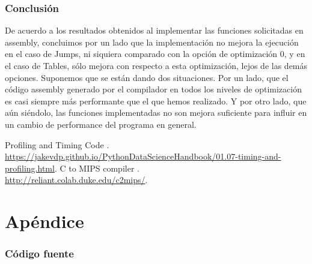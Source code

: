 \documentclass[a4paper, 10pt, twoside, notitlepage]{article}
\begin{document}
\newpage

\section{Conclusión}
De acuerdo a los resultados obtenidos al implementar las funciones solicitadas en assembly, concluimos por un lado que la implementación no mejora la ejecución en el caso de Jumps, ni siquiera comparado con la opción de optimización 0, y en el caso de Tables, sólo mejora con respecto a esta optimización, lejos de las demás opciones.
Suponemos que se están dando dos situaciones. Por un lado, que el código assembly generado por el compilador en todos los niveles de optimización es casi siempre más performante que el que hemos realizado. Y por otro lado, que aún siéndolo, las funciones implementadas no son mejora suficiente para influir en un cambio de performance del programa en general.

\vspace{.5cm}
\begin{thebibliography}{5}
 \bibitem{} Profiling and Timing Code
.\\ \url{https://jakevdp.github.io/PythonDataScienceHandbook/01.07-timing-and-profiling.html}.
 \bibitem{} C to MIPS compiler
.\\ \url{http://reliant.colab.duke.edu/c2mips/}.

\end{thebibliography}

\clearpage

\part{Apéndice}
\appendix

\normalsize
\section{Código fuente}\label{sec:codigofuente}
\end{document}
